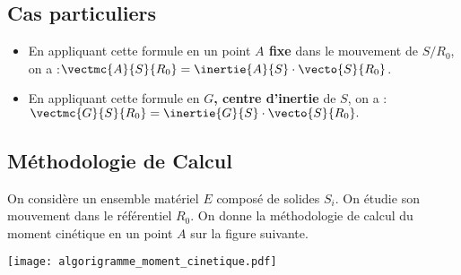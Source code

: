 
\subsection{Cas particuliers}

\begin{itemize}
\item En appliquant cette formule en un point \textbf{$A$ fixe} dans le mouvement de $S/R_0$, on a :$\vectmc{A}{S}{R_0}=\inertie{A}{S}\cdot \vecto{S}{R_0}$.
\item En appliquant cette formule en \textbf{$G$, centre d'inertie} de $S$, on a :
$
\vectmc{G}{S}{R_0}=\inertie{G}{S}\cdot \vecto{S}{R_0}.
$
\end{itemize}



\subsection{Méthodologie de Calcul}

On considère un ensemble matériel $E$ composé de solides $S_i$. On étudie son mouvement dans le référentiel $R_0$.
On donne la méthodologie de calcul du moment cinétique en un point $A$ sur la figure suivante.%

\begin{center}
\texttt{[image: algorigramme\_moment\_cinetique.pdf]}
\end{center}

